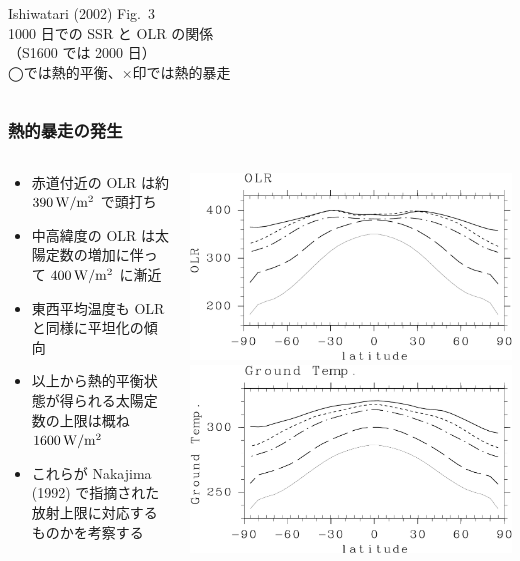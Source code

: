 \documentclass[aspectratio=149,9pt,fleqn]{beamer}
\begin{document}
\begin{frame}
\begin{columns}[T,onlytextwidth]
\begin{column}{.3\textwidth}
			Ishiwatari \etal (2002) Fig.~3\\
			1000 日での SSR と OLR の関係\\
			（S1600 では 2000 日）\\
			◯では熱的平衡、×印では熱的暴走
		\end{column}
	\end{columns}
\end{frame}

\begin{frame}
	\frametitle{熱的暴走の発生}
	\begin{columns}[T,onlytextwidth]
		\begin{column}{.55\textwidth}
			\begin{itemize}
				\item 赤道付近の OLR は約 \(390\hmu{W/m^2}\) で頭打ち
				\item 中高緯度の OLR は太陽定数の増加に伴って \(400\hmu{W/m^2}\) に漸近
				\item 東西平均温度も OLR と同様に平坦化の傾向
				\item 以上から熱的平衡状態が得られる太陽定数の上限は概ね \(1600\hmu{W/m^2}\)
				\item これらが Nakajima \etal (1992) で指摘された放射上限に対応するものかを考察する
			\end{itemize}
		\end{column}
		\begin{column}{.4\textwidth}
			\centering
			\includegraphics[width=\textwidth]{./fig/OLR-meris.kps-crop.pdf}\\
			\includegraphics[width=\textwidth]{./fig/Tg-meris.kps-crop.pdf}\\

\end{column}
\end{columns}
\end{frame}
\end{document}
